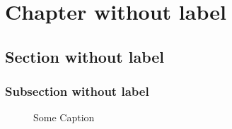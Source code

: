 \documentclass{article}
\begin{document}
    \chapter{Chapter without label}
    \section{Section without label}
    \subsection{Subsection without label}
    \begin{figure}
        \caption{Some Caption}
    \end{figure}
    \begin{figure}

    \end{figure}
\end{document}

